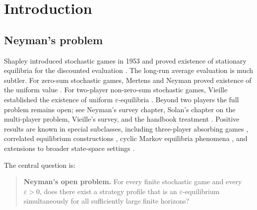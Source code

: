 \documentclass[12pt]{article}
\theoremstyle{definition}
\newcommand{\eps}{\varepsilon}
\newcommand{\1}{\mathbf{1}}
\begin{document}
\begin{abstract}
At each node and for frozen continuation values, every player faces a finite
communicating average-reward MDP on the internal state space with terminal
continuation rewards at exits. The normalized bias is unique after fixing one
reference coordinate, local stationary Nash equilibria exist by Kakutani, and the
global frozen-continuation correspondence has a fixed point. Using the first-exit
controller realization supplied by the tree input, the realized profile satisfies a
regret bound of the form
\[
\eta + C_\eta\delta + \frac{K_\eta}{T}.
\]
Choosing the parameters in that order yields the theorem.
\end{abstract}


\tableofcontents

\section{Introduction}

\subsection{Neyman's problem}

Shapley introduced stochastic games in 1953 and proved existence of stationary
equilibria for the discounted evaluation \cite{Shapley1953}. The long-run average
evaluation is much subtler. For zero-sum stochastic games, Mertens and Neyman
proved existence of the uniform value \cite{MertensNeyman1981}. For two-player
non-zero-sum stochastic games, Vieille established the existence of uniform
$\eps$-equilibria \cite{Vieille2000I,Vieille2000II}. Beyond two players the full
problem remains open; see Neyman's survey chapter, Solan's chapter on the
multi-player problem, Vieille's survey, and the handbook treatment
\cite{Neyman2003,Solan2003,Vieille2002,MertensSorinZamir2003}. Positive results
are known in special subclasses, including three-player absorbing games
\cite{Solan1999}, correlated equilibrium constructions \cite{SolanVieille2002},
cyclic Markov equilibria phenomena \cite{FleschThuijsmanVrieze1997}, and extensions
to broader state-space settings \cite{Nowak2003}.

The central question is:
\begin{quote}
\textbf{Neyman's open problem.}
For every finite stochastic game and every $\eps>0$, does there exist a strategy
profile that is an $\eps$-equilibrium simultaneously for all sufficiently large
finite horizons?
\end{quote}
\end{document}
